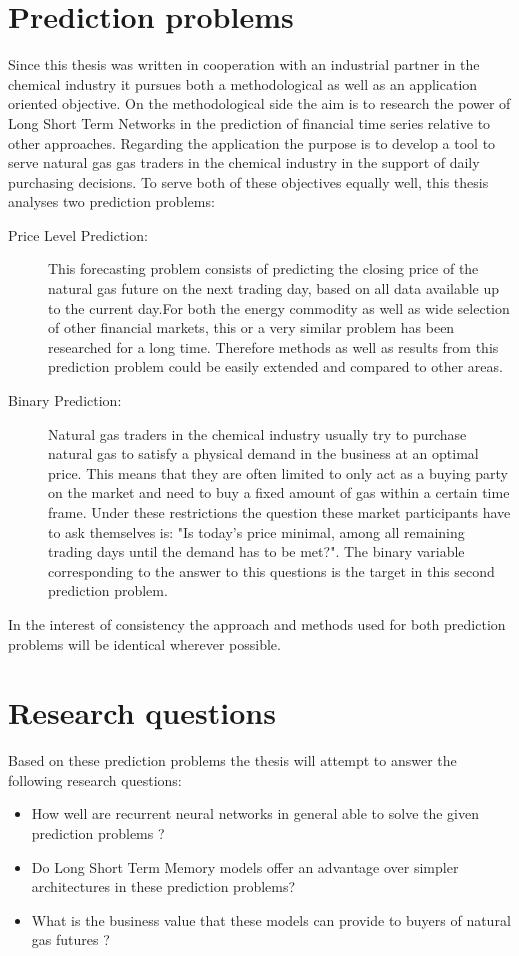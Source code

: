 \section{Prediction problems}
Since this thesis was written in cooperation with an industrial partner in the chemical industry it pursues both a methodological as well as an application oriented objective. On the methodological side the aim is to research the power of Long Short Term Networks in the prediction of financial time series relative to other approaches. Regarding the application the purpose is to develop a tool to serve natural gas gas traders in the chemical industry in the support of daily purchasing decisions. To serve both of these objectives equally well, this thesis analyses two prediction problems:
\begin{description}
\item[Price Level Prediction:] This forecasting problem consists of predicting the closing price of the natural gas future on the next trading day, based on all data available up to the current day.For both the energy commodity as well as wide selection of other financial markets, this or a very similar problem has been researched for a long time. Therefore methods as well as results from this prediction problem could be easily extended and compared to other areas.
\item[Binary Prediction:] Natural gas traders in the chemical industry usually try to purchase natural gas to satisfy a physical demand in the business at an optimal price. This means that they are often limited to only act as a buying party on the market and need to buy a fixed amount of gas within a certain time frame. Under these restrictions the question these market participants have to ask themselves is: "Is today's price minimal, among all remaining trading days until the demand has to be met?". The binary variable corresponding to the answer to this questions is the target in this second prediction problem.
\end{description}
In the interest of consistency the approach and methods used for both prediction problems will be identical wherever possible.
\section{Research questions}
Based on these prediction problems the thesis will attempt to answer the following research questions:
\begin{itemize}
\item How well are recurrent neural networks in general able to solve the given prediction problems ?
\item Do Long Short Term Memory models offer an advantage over simpler architectures in these prediction problems?
\item What is the business value that these models can provide to buyers of natural gas futures ?
\end{itemize}
